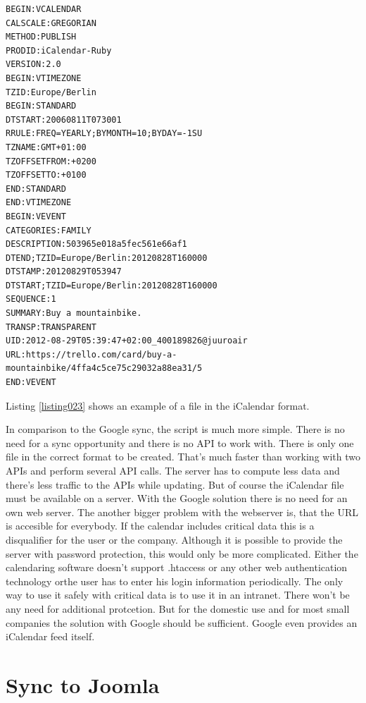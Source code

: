 
\begin{lstlisting}[aboveskip=1\baselineskip, style=bash, caption=iCalendar example., label=listing023]
BEGIN:VCALENDAR
CALSCALE:GREGORIAN
METHOD:PUBLISH
PRODID:iCalendar-Ruby
VERSION:2.0
BEGIN:VTIMEZONE
TZID:Europe/Berlin
BEGIN:STANDARD
DTSTART:20060811T073001
RRULE:FREQ=YEARLY;BYMONTH=10;BYDAY=-1SU
TZNAME:GMT+01:00
TZOFFSETFROM:+0200
TZOFFSETTO:+0100
END:STANDARD
END:VTIMEZONE
BEGIN:VEVENT
CATEGORIES:FAMILY
DESCRIPTION:503965e018a5fec561e66af1
DTEND;TZID=Europe/Berlin:20120828T160000
DTSTAMP:20120829T053947
DTSTART;TZID=Europe/Berlin:20120828T160000
SEQUENCE:1
SUMMARY:Buy a mountainbike.
TRANSP:TRANSPARENT
UID:2012-08-29T05:39:47+02:00_400189826@juuroair
URL:https://trello.com/card/buy-a-mountainbike/4ffa4c5ce75c29032a88ea31/5
END:VEVENT
\end{lstlisting}

Listing \ref{listing023} shows an example of a file in the iCalendar format.


In comparison to the Google sync, the script is much more simple. There is no need for a sync opportunity and there is no API to work with. There is only one file in the correct format to be created. That's much faster than working with two APIs and perform several API calls. The server has to compute less data and there's less traffic to the APIs while updating. But of course the iCalendar file must be available on a server. With the Google solution there is no need for an own web server. The another bigger problem with the webserver is, that the URL is accesible for everybody. If the calendar includes critical data this is a disqualifier for the user or the company. Although it is possible to provide the server with password protection, this would only be more complicated. Either the calendaring software doesn't support .htaccess or any other web authentication technology orthe user has to enter his login information periodically. The only way to use it safely with critical data is to use it in an intranet. There won't be any need for additional protcetion. But for the domestic use and for most small companies the solution with Google  should be sufficient. Google even provides an iCalendar feed itself. 

\section{Sync to Joomla}

